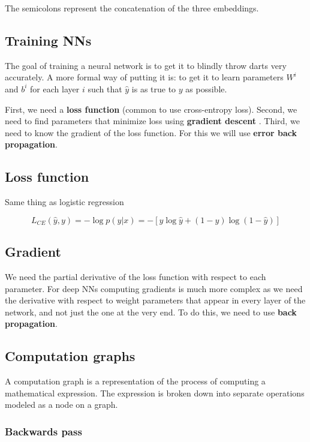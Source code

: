 \documentclass[11pt]{article}
\begin{document}
The semicolons represent the concatenation of the three embeddings.

\subsection{Training NNs}


The goal of training a neural network is to get it to blindly throw darts very accurately. A more formal way of putting it is: to get it to learn parameters $W^i$ and $b^i$ for each layer $i$ such that $\hat{y}$ is as true to $y$ as possible.

First, we need a \textbf{loss function} (common to use cross-entropy loss). Second, we need to find parameters that minimize loss using \textbf{gradient descent }. Third, we need to know the gradient of the loss function. For this we will use \textbf{error back propagation}.

\subsection{Loss function}

Same thing as logistic regression

\begin{equation*}
	L_{CE}(\hat{y}, y) = -\log p(y|x) = -[y\log \hat{y} + (1 - y) \log(1 - \hat{y})]
\end{equation*}

\subsection{Gradient}

We need the partial derivative of the loss function with respect to each parameter. For deep NNs computing gradients is much more complex as we need the derivative with respect to weight parameters that appear in every layer of the network, and not just the one at the very end. To do this, we need to use \textbf{back propagation}.

\subsection{Computation graphs}

A computation graph is a representation of the process of computing a mathematical expression. The expression is broken down into separate operations modeled as a node on a graph.

\subsubsection{Backwards pass}
\end{document}

